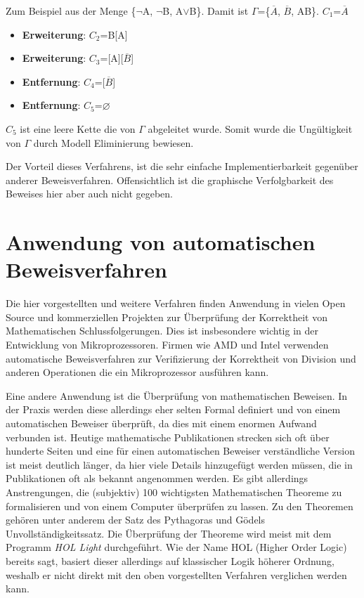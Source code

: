 Zum Beispiel aus der Menge \{$\neg$A, $\neg$B, A$\vee$B\}. Damit ist $\Gamma$=\{$\overline{A}$, $\overline{B}$, AB\}. $C_{1}$=$\overline{A}$
\begin{itemize}
\item \textbf{Erweiterung}: $C_{2}$=B[A]
\item \textbf{Erweiterung}: $C_{3}$=[A][$\overline{B}$]
\item \textbf{Entfernung}: $C_{4}$=[$\overline{B}$]
\item \textbf{Entfernung}: $C_{5}$=$\varnothing$
\end{itemize}
$C_{5}$ ist eine leere Kette die von $\Gamma$ abgeleitet wurde. Somit wurde die Ungültigkeit von $\Gamma$ durch Modell Eliminierung bewiesen.

Der Vorteil dieses Verfahrens, ist die sehr einfache Implementierbarkeit gegenüber anderer Beweisverfahren. Offensichtlich ist die graphische Verfolgbarkeit des Beweises hier aber auch nicht gegeben.

\section{Anwendung von automatischen Beweisverfahren}
Die hier vorgestellten und weitere Verfahren finden Anwendung in vielen Open Source und kommerziellen Projekten zur Überprüfung der Korrektheit von Mathematischen Schlussfolgerungen. Dies ist insbesondere wichtig in der Entwicklung von Mikroprozessoren. Firmen wie AMD und Intel verwenden automatische Beweisverfahren zur Verifizierung der Korrektheit von Division und anderen Operationen die ein Mikroprozessor ausführen kann.

Eine andere Anwendung ist die Überprüfung von mathematischen Beweisen. In der Praxis werden diese allerdings eher selten Formal definiert und von einem automatischen Beweiser überprüft, da dies mit einem enormen Aufwand verbunden ist. Heutige mathematische Publikationen strecken sich oft über hunderte Seiten und eine für einen automatischen Beweiser verständliche Version ist meist deutlich länger, da hier viele Details hinzugefügt werden müssen, die in Publikationen oft als bekannt angenommen werden. Es gibt allerdings Anstrengungen, die (subjektiv) 100 wichtigsten Mathematischen Theoreme zu formalisieren und von einem Computer überprüfen zu lassen. \cite{formalize_100_theorems} Zu den Theoremen gehören unter anderem der Satz des Pythagoras und Gödels Unvollständigkeitssatz. Die Überprüfung der Theoreme wird meist mit dem Programm \textit{HOL Light} durchgeführt. Wie der Name HOL (Higher Order Logic) bereits sagt, basiert dieser allerdings auf klassischer Logik höherer Ordnung, weshalb er nicht direkt mit den oben vorgestellten Verfahren verglichen werden kann.
